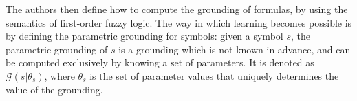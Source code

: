  The authors then define how to compute the grounding of formulas, by using the semantics of first-order fuzzy logic. 
 The way in which learning becomes possible is by defining the parametric grounding for symbols: given a symbol $s$, the parametric grounding of $s$ is a grounding which is not known in advance, and can be computed exclusively by knowing a set of parameters. It is denoted as $\mathcal{G}(s|\theta_s)$, where $\theta_s$ is the set of parameter values that uniquely determines the value of the grounding. 
